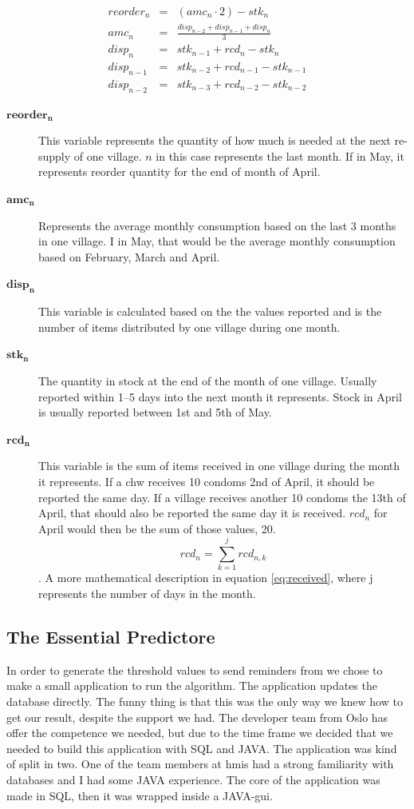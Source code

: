 \begin{eqnarray}
reorder_{n} & = & (amc_{n} \cdot 2) - stk_{n} \\
amc_{n} & = & \frac{disp_{n-2} + disp_{n-1} + disp_{n}}{3} \\
disp_{n} & = & stk_{n-1} + rcd_{n} - stk_{n} \\
disp_{n-1} & = & stk_{n-2} + rcd_{n-1} - stk_{n-1} \\
disp_{n-2} & = & stk_{n-3} + rcd_{n-2} - stk_{n-2}
\end{eqnarray}


\begin{description}
\item[$\mathbf{reorder_{n}}$]
This variable represents the quantity of how much is needed at the next re-supply of one village. $n$ in this case represents the last month. If in May, it represents reorder quantity for the end of month of April.
\item[$\mathbf{amc_{n}}$]
Represents the average monthly consumption based on the last 3 months in one village. I in May, that would be the average monthly consumption based on February, March and April.
\item[$\mathbf{disp_{n}}$]
This variable is calculated based on the the values reported and is the number of items distributed by one village during one month.
\item[$\mathbf{stk_{n}}$]
The quantity in stock at the end of the month of one village. Usually reported within 1--5 days into the next month it represents. Stock in April is usually reported between 1st and 5th of May.
\item[$\mathbf{rcd_{n}}$]
This variable is the sum of items received in one village during the month it represents. If a \gls{chw} receives 10 condoms 2nd of April, it should be reported the same day. If a village receives another 10 condoms the 13th of April, that should also be reported the same day it is received. $rcd_{n}$ for April would then be the sum of those values, 20.
\begin{equation}
rcd_{n} = \sum_{k = 1}^{j} rcd_{n,k}
\label{eq:received}
\end{equation}.
A more mathematical description in equation \ref{eq:received}, where j represents the number of days in the month.
\end{description}

\subsection{The Essential Predictore}
In order to generate the threshold values to send reminders from we chose to make a small application to run the algorithm. The application updates the database directly. The funny thing is that this was the only way we knew how to get our result, despite the support we had. The developer team from Oslo has offer the competence we needed, but due to the time frame we decided that we needed to build this application with SQL and JAVA. The application was kind of split in two. One of the team members at \gls{hmis} had a strong familiarity with databases and I had some JAVA experience. The core of the application was made in SQL, then it was wrapped inside a JAVA-\gls{gui}.

